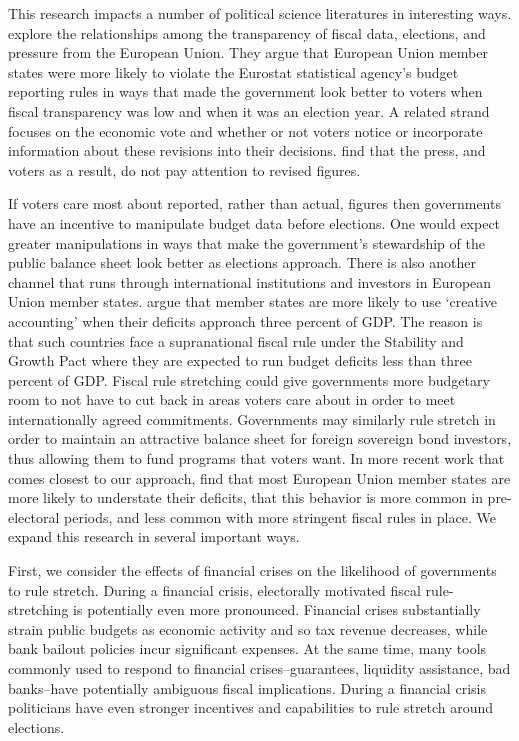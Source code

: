 \documentclass[]{article}
\begin{document}
This research impacts a number of political science literatures in interesting ways. \cite{Alt2014} explore the relationships among the transparency of fiscal data, elections, and pressure from the European Union. They argue that European Union member states were more likely to violate the Eurostat statistical agency's budget reporting rules in ways that made the government look better to voters when fiscal transparency was low and when it was an election year. A related strand focuses on the economic vote and whether or not voters notice or incorporate information about these revisions into their decisions. \cite{KayserLeininger2015} find that the press, and voters as a result, do not pay attention to revised figures.

If voters care most about reported, rather than actual, figures then governments have an incentive to manipulate budget data before elections. One would expect greater manipulations in ways that make the government's stewardship of the public balance sheet look better as elections approach. There is also another channel that runs through international institutions and investors in European Union member states. \cite{vonHagenWolff2006} argue that member states are more likely to use `creative accounting' when their deficits approach three percent of GDP. The reason is that such countries face a supranational fiscal rule under the Stability and Growth Pact where they are expected to run budget deficits less than three percent of GDP. Fiscal rule stretching could give governments more budgetary room to not have to cut back in areas voters care about in order to meet internationally agreed commitments. Governments may similarly rule stretch in order to maintain an attractive balance sheet for foreign sovereign bond investors, thus allowing them to fund programs that voters want. In more recent work that comes closest to our approach, \cite{DeCastro2013} find that most European Union member states are more likely to understate their deficits, that this behavior is more common in pre-electoral periods, and less common with more stringent fiscal rules in place. We expand this research in several important ways.

First, we consider the effects of financial crises on the likelihood of governments to rule stretch. During a financial crisis, electorally motivated fiscal rule-stretching is potentially even more pronounced. Financial crises substantially strain public budgets as economic activity and so tax revenue decreases, while bank bailout policies incur significant expenses. At the same time, many tools commonly used to respond to financial crises--guarantees, liquidity assistance, bad banks--have potentially ambiguous fiscal implications. During a financial crisis politicians have even stronger incentives and capabilities to rule stretch around elections.
\end{document}
